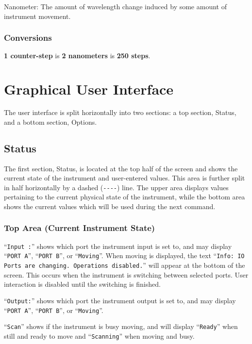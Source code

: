 \documentclass{article}
\begin{document}
Nanometer: The amount of wavelength change induced by some amount of instrument movement.

\subsubsection{Conversions}

\textbf{1 counter-step} is \textbf{2 nanometers} is \textbf{250 steps}.

\section{Graphical User Interface} \label{section:interface}

The user interface is split horizontally into two sections: a top section, Status, and a bottom section, Options.

\subsection{Status} \label{subsection:status}

The first section, Status, is located at the top half of the screen and shows the current state of the instrument and user-entered values. This area is further split in half horizontally by a dashed (\verb|----|) line. The upper area displays values pertaining to the current physical state of the instrument, while the bottom area shows the current values which will be used during the next command.

\subsubsection{Top Area (Current Instrument State)} \label{subsubsection:statustoparea}

``\verb|Input :|'' shows which port the instrument input is set to, and may display ``\verb|PORT A|'', ``\verb|PORT B|'', or ``\verb|Moving|''. When moving is displayed, the text ``\verb|Info: IO Ports are changing. Operations disabled.|'' will appear at the bottom of the screen. This occurs when the instrument is switching between selected ports. User interaction is disabled until the switching is finished.

``\verb|Output:|'' shows which port the instrument output is set to, and may display ``\verb|PORT A|'', ``\verb|PORT B|'', or ``\verb|Moving|''.

``\verb|Scan|'' shows if the instrument is busy moving, and will display ``\verb|Ready|'' when still and ready to move and ``\verb|Scanning|'' when moving and busy.
\end{document}
